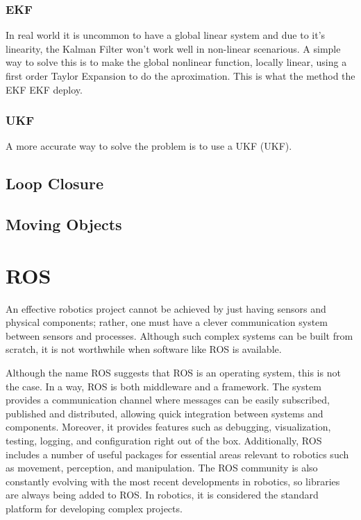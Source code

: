 \subsubsection{\acl{EKF}}

In real world it is uncommon to have a global linear system and due to it's linearity, the Kalman Filter won't work well in non-linear scenarious. A simple way to solve this is to make the global nonlinear function, locally linear, using a first order Taylor Expansion to do the aproximation. This is what the method the \acl{EKF} \acs*{EKF} deploy.

\subsubsection*{\acl*{UKF}}



 A more accurate way to solve the problem is to use a \acl*{UKF} (\acs*{UKF}).


\subsection{Loop Closure}

\subsection{Moving Objects}

\section{\acs{ROS}}

An effective robotics project cannot be achieved by just having sensors and physical components; rather, one must have a clever communication system between sensors and processes. Although such complex systems can be built from scratch, it is not worthwhile when software like \acs*{ROS} is available.

Although the name \acl*{ROS} suggests that ROS is an operating system, this is not the case.  In a way, \acs*{ROS} is both middleware and a framework. The system provides a communication channel where messages can be easily subscribed, published and distributed, allowing quick integration between systems and components. Moreover, it provides features such as debugging, visualization, testing, logging, and configuration right out of the box. Additionally, ROS includes a number of useful packages for essential areas relevant to robotics such as movement, perception, and manipulation. The ROS community is also constantly evolving with the most recent developments in robotics, so libraries are always being added to ROS. In robotics, it is considered the standard platform for developing complex projects.

